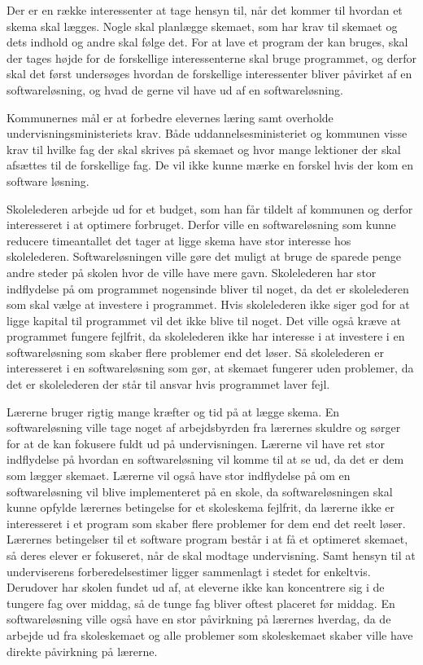 Der er en række interessenter at tage hensyn til, når det kommer til hvordan et skema skal lægges. Nogle skal planlægge skemaet, som har krav til skemaet og dets indhold og andre skal følge det. For at lave et program der kan bruges, skal der tages højde for de forskellige interessenterne skal bruge programmet, og derfor skal det først undersøges hvordan de forskellige interessenter bliver påvirket af en softwareløsning, og hvad de gerne vil have ud af en softwareløsning. 

Kommunernes mål er at forbedre elevernes læring samt overholde undervisningsministeriets krav. Både uddannelsesministeriet og kommunen visse krav til hvilke fag der skal skrives på skemaet og hvor mange lektioner der skal afsættes til de forskellige fag. De vil ikke kunne mærke en forskel hvis der kom en software løsning.

Skolelederen arbejde ud for et budget, som han får tildelt af kommunen og derfor interesseret i at optimere forbruget. Derfor ville en softwareløsning som kunne reducere timeantallet det tager at ligge skema have stor interesse hos skolelederen. Softwareløsningen ville gøre det muligt at bruge de sparede penge andre steder på skolen hvor de ville have mere gavn. Skolelederen har stor indflydelse på om programmet nogensinde bliver til noget, da det er skolelederen som skal vælge at investere i programmet. Hvis skolelederen ikke siger god for at ligge kapital til programmet vil det ikke blive til noget. Det ville også kræve at programmet fungere fejlfrit, da skolelederen ikke har interesse i at investere i en softwareløsning som skaber flere problemer end det løser. Så skolelederen er interesseret i en softwareløsning som gør, at skemaet fungerer uden problemer, da det er skolelederen der står til ansvar hvis programmet laver fejl.

Lærerne bruger rigtig mange kræfter og tid på at lægge skema. En softwareløsning ville tage noget af arbejdsbyrden fra lærernes skuldre og sørger for at de kan fokusere fuldt ud på undervisningen. Lærerne vil have ret stor indflydelse på hvordan en softwareløsning vil komme til at se ud, da det er dem som lægger skemaet. Lærerne vil også have stor indflydelse på om en softwareløsning vil blive implementeret på en skole, da softwareløsningen skal kunne opfylde lærernes betingelse for et skoleskema fejlfrit, da lærerne ikke er interesseret i et program som skaber flere problemer for dem end det reelt løser. Lærernes betingelser til et software program består i at få et optimeret skemaet, så deres elever er fokuseret, når de skal modtage undervisning. Samt hensyn til at underviserens forberedelsestimer ligger sammenlagt i stedet for enkeltvis. Derudover har skolen fundet ud af, at eleverne ikke kan koncentrere sig i de tungere fag over middag, så de tunge fag bliver oftest placeret før middag. En softwareløsning ville også have en stor påvirkning på lærernes hverdag, da de arbejde ud fra skoleskemaet og alle problemer som skoleskemaet skaber ville have direkte påvirkning på lærerne.

